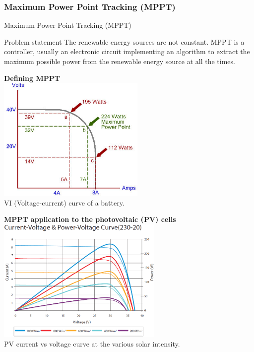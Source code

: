 \documentclass{beamer}
\begin{document}
\subsubsection{Maximum Power Point Tracking (MPPT)}
\begin{frame}[allowframebreaks]{Maximum Power Point Tracking (MPPT)}
	\begin{block}{Problem statement}
		The renewable energy sources are not constant. MPPT is a controller, usually an electronic circuit implementing an algorithm to extract the maximum possible power from the renewable energy source at all the times.
	\end{block}
	\framebreak
	\begin{center}
		\textbf{Defining MPPT}\\
		\includegraphics[height=6cm]{images/mppt-power-source}\\
		VI (Voltage-current) curve of a battery.
	\end{center}
	\framebreak
	\begin{center}
		\textbf{MPPT application to the photovoltaic (PV) cells}\\
		\includegraphics[height=6cm]{images/mppt-solar}\\
		PV current vs voltage curve at the various solar intensity.
	\end{center}
	\framebreak
	\begin{center}

\end{center}
\end{frame}
\end{document}
